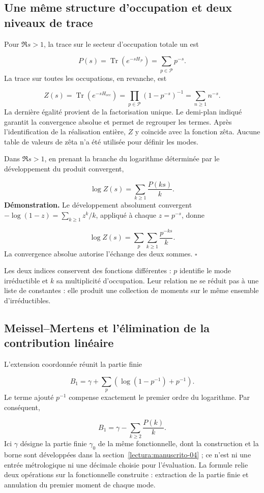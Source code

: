 \subsection{Une même structure d'occupation et deux niveaux de trace}
Pour $\Re s>1$, la trace sur le secteur d'occupation totale un est

\[
P(s)=\operatorname{Tr}(e^{-sH_{\mathcal P}})=\sum_{p\in\mathcal P}p^{-s}.
\]
La trace sur toutes les occupations, en revanche, est

\[
Z(s)=\operatorname{Tr}(e^{-sH_{\mathrm{occ}}})
=\prod_{p\in\mathcal P}(1-p^{-s})^{-1}
=\sum_{n\ge1}n^{-s}.
\]
La dernière égalité provient de la factorisation unique. Le demi-plan indiqué garantit la convergence absolue et permet de regrouper les termes. Après l’identification de la réalisation entière, $Z$ y coïncide avec la fonction zêta. Aucune table de valeurs de zêta n’a été utilisée pour définir les modes.

Dans $\Re s>1$, en prenant la branche du logarithme déterminée par le développement du produit convergent,

\[
\log Z(s)=\sum_{k\ge1}\frac{P(ks)}{k}.
\]
\textbf{Démonstration.} Le développement absolument convergent $-\log(1-z)=\sum_{k\ge1}z^k/k$, appliqué à chaque $z=p^{-s}$, donne

\[
\log Z(s)=\sum_p\sum_{k\ge1}\frac{p^{-ks}}k.
\]
La convergence absolue autorise l'échange des deux sommes. \hfill\(\square\)

Les deux indices conservent des fonctions différentes : $p$ identifie le mode irréductible et $k$ sa multiplicité d'occupation. Leur relation ne se réduit pas à une liste de constantes : elle produit une collection de moments sur le même ensemble d'irréductibles.

\subsection{Meissel–Mertens et l'élimination de la contribution linéaire}
L'extension coordonnée réunit la partie finie

\[
B_1=\gamma+\sum_p\left(\log(1-p^{-1})+p^{-1}\right).
\]
Le terme ajouté $p^{-1}$ compense exactement le premier ordre du logarithme. Par conséquent,

\[
B_1=\gamma-\sum_{k\ge2}\frac{P(k)}k.
\]
Ici $\gamma$ désigne la partie finie $\gamma_0$ de la même fonctionnelle, dont la construction et la borne sont développées dans la section~\ref{lectura:manuscrito-04} ; ce n’est ni une entrée métrologique ni une décimale choisie pour l’évaluation. La formule relie deux opérations sur la fonctionnelle construite : extraction de la partie finie et annulation du premier moment de chaque mode.

